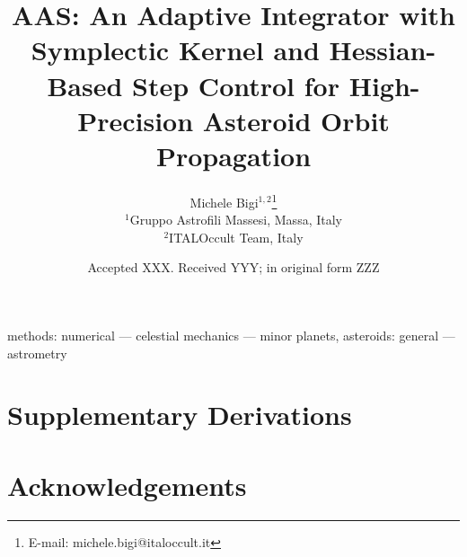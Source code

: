 \documentclass[fleqn,usenatbib]{mnras}
\begin{document}
\title[AAS: Adaptive Integrator with Symplectic Kernel]{AAS: An Adaptive Integrator with Symplectic Kernel and Hessian-Based Step
  Control for High-Precision Asteroid Orbit Propagation}

\author[M. Bigi]{
Michele Bigi$^{1,2}$\thanks{E-mail: michele.bigi@italoccult.it}\\
$^{1}$Gruppo Astrofili Massesi, Massa, Italy\\
$^{2}$ITALOccult Team, Italy
}

\date{Accepted XXX. Received YYY; in original form ZZZ}
\maketitle

\begin{abstract}

\end{abstract}

\begin{keywords}
  methods: numerical ---
  celestial mechanics ---
  minor planets, asteroids: general ---
  astrometry
\end{keywords}









\appendix
\section{Supplementary Derivations}





\section*{Acknowledgements}

\end{document}
